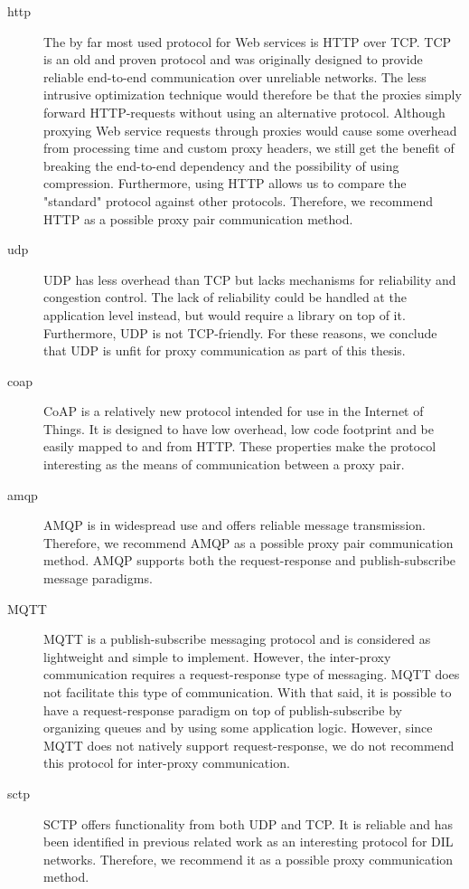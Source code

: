 \begin{description}

    \item[\gls{http}] The by far most used protocol for Web services is HTTP
    over TCP. TCP is an old and proven protocol and was originally designed to
    provide reliable end-to-end communication over unreliable networks. The less
    intrusive optimization technique would therefore be that the proxies simply
    forward HTTP-requests without using an alternative protocol. Although
    proxying Web service requests through proxies would cause some overhead from
    processing time and custom proxy headers, we still get the benefit of
    breaking the end-to-end dependency and the possibility of using compression.
    Furthermore, using HTTP allows us to compare the "standard" protocol against
    other protocols. Therefore, we recommend HTTP as a possible proxy pair
    communication method.

    \item[\gls{udp}] UDP has less overhead than TCP but lacks mechanisms for
    reliability and congestion control. The lack of reliability could be handled
    at the application level instead, but would require a library on top of it.
    Furthermore, UDP is not TCP-friendly. For these reasons, we conclude that
    UDP is unfit for proxy communication as part of this thesis.

	\item[\gls{coap}] CoAP is a relatively new protocol intended for use in the
	Internet of Things. It is designed to have low overhead, low code footprint and
	be easily mapped to and from HTTP. These properties make the protocol
	interesting as the means of communication between a proxy pair.

	\item[\gls{amqp}] AMQP is in widespread use and offers reliable message
	transmission. Therefore, we recommend AMQP as a possible proxy pair
	communication method. AMQP supports both the request-response and
	publish-subscribe message paradigms.

	\item[MQTT] MQTT is a publish-subscribe messaging protocol and is considered
	as lightweight and simple to implement. However, the inter-proxy
	communication requires a request-response type of messaging. MQTT does not
	facilitate this type of communication. With that said, it is possible to
	have a request-response paradigm on top of publish-subscribe by organizing
	queues and by using some application logic. However, since MQTT does not
	natively support request-response, we do not recommend this protocol for
	inter-proxy communication.

	\item[\gls{sctp}] SCTP offers functionality from both UDP and TCP. It is
	reliable and has been identified in previous related work as an interesting
	protocol for DIL networks. Therefore, we recommend it as a possible proxy
	communication method.

\end{description}


